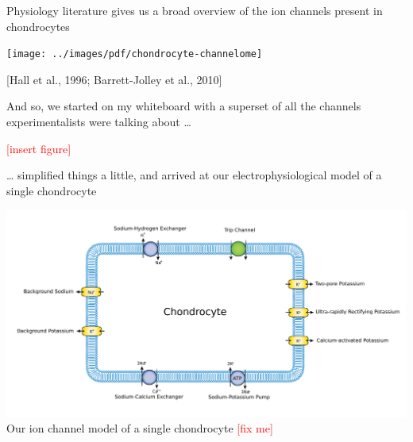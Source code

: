 \documentclass[ignorenonframetext]{beamer}
\newcommand{\references}[1] {
  \begin{flushright}
    \scriptsize [#1] \normalsize
  \end{flushright}
}
\newcommand{\addfigure} {
  \scriptsize
  \textcolor{red}{[insert figure]}
  \normalsize
}
\newcommand{\fixme} {
  \scriptsize
  \textcolor{red}{[fix me]}
  \normalsize
}
\begin{document}
%
%
%

\begin{frame}{Physiology literature gives us a broad overview of the
    ion channels present in chondrocytes}

  \vspace{0.4cm}
  \texttt{[image: ../images/pdf/chondrocyte-channelome]}

  \references{Hall et al., 1996; Barrett-Jolley et al., 2010}

\end{frame}


\begin{frame}{And so, we started on my whiteboard with a superset of
    all the channels experimentalists were talking about \ldots}

  \addfigure

\end{frame}

%
%

\begin{frame}{\ldots{} simplified things a little, and arrived at our
    electrophysiological model of a single chondrocyte}

  \begin{center}
    \includegraphics[width=\textwidth]{../images/pdf/chondrocyte-model-cellml}
    {\\[-0.1cm] \scriptsize Our ion channel model of a single chondrocyte \fixme}
  \end{center}

\end{frame}
\end{document}
